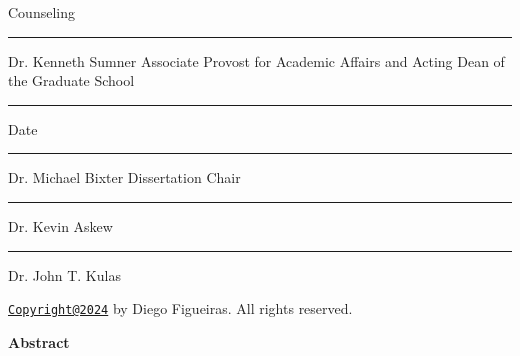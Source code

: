 \documentclass[
  man]{apa7}
\begin{document}
\begin{multicols}{2}  


\newline
Counseling

\vskip 0.6in


\vskip 0.6in  

\linespread{1.0}\selectfont
\noindent\rule{6cm}{0.2mm}
\newline
Dr. Kenneth Sumner 
\newline
Associate Provost for Academic Affairs and
\newline
Acting Dean of the Graduate School

\vskip 0.3in

\noindent\rule{6cm}{0.2mm}
\newline
Date

\columnbreak


\vskip 0.6in

\noindent\rule{6cm}{0.2mm}
\newline
Dr. Michael Bixter
\newline
Dissertation Chair

\vskip 0.6in

\noindent\rule{6cm}{0.2mm}
\newline
Dr. Kevin Askew

\vskip 0.6in

\noindent\rule{6cm}{0.2mm}
\newline
Dr. John T. Kulas


\end{multicols}

\newpage
{}
\renewcommand{\headrulewidth}{0pt}
\renewcommand{\footrulewidth}{0pt}

\begin{center}

\phantom{i'm a ghost}

\vskip 1.6in

\href{mailto:Copyright@2024}{\nolinkurl{Copyright@2024}} by Diego Figueiras. All rights reserved.

\end{center}

\newpage
{}
\renewcommand{\headrulewidth}{0pt}
\renewcommand{\footrulewidth}{0pt}

\begin{center}

\textbf{Abstract}

\end{center}
\end{document}
